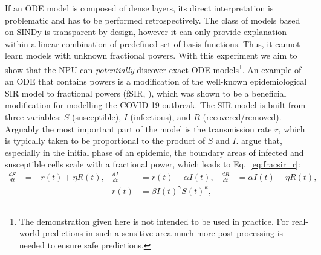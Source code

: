 \documentclass[9pt]{article}
\begin{document}
If an ODE model is composed of dense layers, its direct interpretation is
problematic and has to be performed retrospectively. The class of models based on
SINDy is transparent by design, however it can only provide explanation
within a linear combination of predefined set of basis functions. Thus, it
cannot learn models with unknown fractional powers. 
With this experiment we aim to show that the NPU can \emph{potentially} discover
exact ODE models\footnote{The demonstration given here is not intended to be
used in practice. For real-world predictions in such a sensitive area much more
post-processing is needed to ensure safe predictions.}.
An example of an ODE that contains powers is a modification of the well-known
epidemiological SIR model \citep{kermack_contribution_1927} to fractional powers
(fSIR, \cite{taghvaei_fractional_2020}), which was shown to be a beneficial
modification for modelling the COVID-19 outbreak.  The SIR model is
built from three variables: $S$ (susceptible), $I$ (infectious), and $R$
(recovered/removed).  Arguably the most important part of the model is the
transmission rate $r$, which is typically taken to be proportional to the
product of $S$ and $I$.  \citet{taghvaei_fractional_2020} argue that,
especially in the initial phase of an epidemic, the boundary areas of infected
and susceptible cells scale with a fractional power, which leads to
Eq.~\ref{eq:fracsir_r}:
\begin{align}
  \label{eq:fracsir}
  \frac{dS}{dt} &= -r(t) + \eta R(t), &
  \frac{dI}{dt} &=  r(t) - \alpha I(t), &
  \frac{dR}{dt} &= \alpha I(t) - \eta R(t),\\
  \label{eq:fracsir_r}
  & & r(t) &= \beta I(t)^\gamma S(t)^\kappa,
\end{align}
\end{document}
